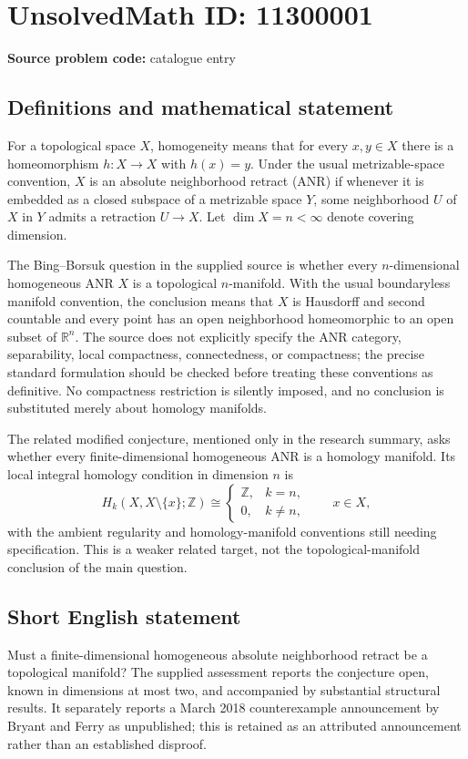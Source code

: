 \documentclass[11pt]{article}
\newcommand{\Z}{\mathbb{Z}}
\newcommand{\R}{\mathbb{R}}
\begin{document}
\section*{UnsolvedMath ID: 11300001}
\textbf{Source problem code:} catalogue entry
\subsection{Definitions and mathematical statement}
For a topological space $X$, homogeneity means that for every $x,y\in X$ there is a homeomorphism $h:X\to X$ with $h(x)=y$. Under the usual metrizable-space convention, $X$ is an absolute neighborhood retract (ANR) if whenever it is embedded as a closed subspace of a metrizable space $Y$, some neighborhood $U$ of $X$ in $Y$ admits a retraction $U\to X$. Let $\dim X=n<\infty$ denote covering dimension.

The Bing--Borsuk question in the supplied source is whether every $n$-dimensional homogeneous ANR $X$ is a topological $n$-manifold. With the usual boundaryless manifold convention, the conclusion means that $X$ is Hausdorff and second countable and every point has an open neighborhood homeomorphic to an open subset of $\R^n$. The source does not explicitly specify the ANR category, separability, local compactness, connectedness, or compactness; the precise standard formulation should be checked before treating these conventions as definitive. No compactness restriction is silently imposed, and no conclusion is substituted merely about homology manifolds.

The related modified conjecture, mentioned only in the research summary, asks whether every finite-dimensional homogeneous ANR is a homology manifold. Its local integral homology condition in dimension $n$ is
\[
 H_k(X,X\setminus\{x\};\Z)\cong
 \begin{cases}\Z,&k=n,\\0,&k\ne n,\end{cases}
 \qquad x\in X,
\]
with the ambient regularity and homology-manifold conventions still needing specification. This is a weaker related target, not the topological-manifold conclusion of the main question.
\subsection{Short English statement}
Must a finite-dimensional homogeneous absolute neighborhood retract be a topological manifold? The supplied assessment reports the conjecture open, known in dimensions at most two, and accompanied by substantial structural results. It separately reports a March 2018 counterexample announcement by Bryant and Ferry as unpublished; this is retained as an attributed announcement rather than an established disproof.
\end{document}
